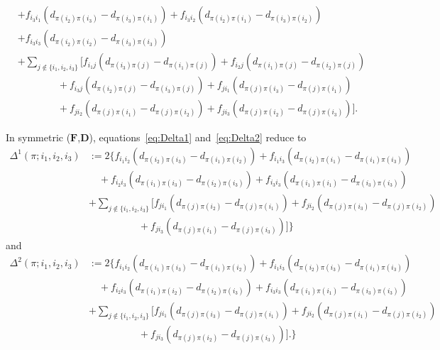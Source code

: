 \begin{defi}
\begin{equation}
\begin{split}
&+f_{i_3i_1}\left(d_{\pi(i_2)\pi(i_3)}-d_{\pi(i_3)\pi(i_1)}\right)
+f_{i_3i_2}\left(d_{\pi(i_2)\pi(i_1)}-d_{\pi(i_3)\pi(i_2)}\right) \\
&+f_{i_3i_3}\left(d_{\pi(i_2)\pi(i_2)}-d_{\pi(i_3)\pi(i_3)}\right)\\
&+\sum_{j\notin\{i_1,i_2,i_3\}}\Big[
f_{i_1j}\left(d_{\pi(i_3)\pi(j)}-d_{\pi(i_1)\pi(j)}\right)
+f_{i_2j}\left(d_{\pi(i_1)\pi(j)}-d_{\pi(i_2)\pi(j)}\right)\\
&\qquad \qquad
+f_{i_3j}\left(d_{\pi(i_2)\pi(j)}-d_{\pi(i_3)\pi(j)}\right)
+f_{ji_1}\left(d_{\pi(j)\pi(i_3)}-d_{\pi(j)\pi(i_1)}\right) \\
&\qquad \qquad
+f_{ji_2}\left(d_{\pi(j)\pi(i_1)}-d_{\pi(j)\pi(i_2)}\right)
+f_{ji_3}\left(d_{\pi(j)\pi(i_2)}-d_{\pi(j)\pi(i_3)}\right) \Big].
\end{split}
\end{equation}	
\normalsize
\end{defi}

\begin{oss}
In symmetric \QAP($\bm F$,$\bm D$), equations~\eqref{eq:Delta1} and~\eqref{eq:Delta2} reduce to 
\footnotesize
\[
\begin{split}
\Delta^1(\pi;i_1,i_2,i_3)&:=
2\Big\{f_{i_1i_2}\left(d_{\pi(i_2)\pi(i_3)}-d_{\pi(i_1)\pi(i_2)}\right)
+f_{i_1i_3}\left(d_{\pi(i_2)\pi(i_1)}-d_{\pi(i_1)\pi(i_3)}\right)\\
&\quad
+f_{i_2i_3}\left(d_{\pi(i_1)\pi(i_3)}-d_{\pi(i_2)\pi(i_3)}\right) 
+f_{i_3i_3}\left(d_{\pi(i_1)\pi(i_1)}-d_{\pi(i_3)\pi(i_3)}\right)\\
&+\sum_{j\notin\{i_1,i_2,i_3\}}\Big[
f_{ji_1}\left(d_{\pi(j)\pi(i_2)}-d_{\pi(j)\pi(i_1)}\right)
+f_{ji_2}\left(d_{\pi(j)\pi(i_3)}-d_{\pi(j)\pi(i_2)}\right)\\
&\qquad \qquad \quad
+f_{ji_3}\left(d_{\pi(j)\pi(i_1)}-d_{\pi(j)\pi(i_3)}\right)
 \Big]
\Big\}
\end{split}
\]
\normalsize
and
\footnotesize
\[
\begin{split}
\Delta^2(\pi;i_1,i_2,i_3)&:=
2\Big\{f_{i_1i_2}\left(d_{\pi(i_1)\pi(i_3)}-d_{\pi(i_1)\pi(i_2)}\right)
+f_{i_1i_3}\left(d_{\pi(i_2)\pi(i_3)}-d_{\pi(i_1)\pi(i_3)}\right)\\
&\quad
+f_{i_2i_3}\left(d_{\pi(i_1)\pi(i_2)}-d_{\pi(i_2)\pi(i_3)}\right) 
+f_{i_3i_3}\left(d_{\pi(i_1)\pi(i_1)}-d_{\pi(i_3)\pi(i_3)}\right)\\
&+\sum_{j\notin\{i_1,i_2,i_3\}}\Big[
f_{ji_1}\left(d_{\pi(j)\pi(i_3)}-d_{\pi(j)\pi(i_1)}\right)
+f_{ji_2}\left(d_{\pi(j)\pi(i_1)}-d_{\pi(j)\pi(i_2)}\right)\\
&\qquad \qquad \quad
+f_{ji_3}\left(d_{\pi(j)\pi(i_2)}-d_{\pi(j)\pi(i_3)}\right)
\Big].
\Big\}
\end{split}
\]
\normalsize
\end{oss}


